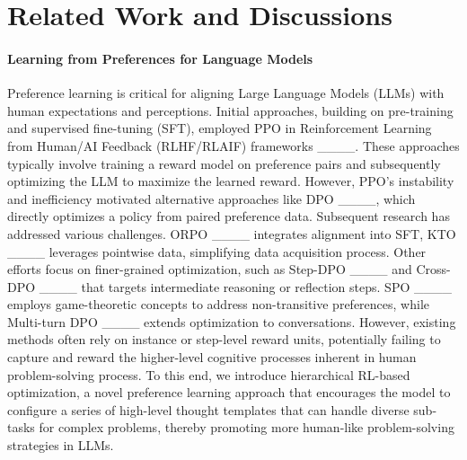 \section{Related Work and Discussions}
\paragraph{Learning from Preferences for Language Models}


Preference learning is critical for aligning Large Language Models (LLMs) with human expectations and perceptions. Initial approaches, building on pre-training and supervised fine-tuning (SFT), employed PPO in Reinforcement Learning from Human/AI Feedback (RLHF/RLAIF) frameworks ____. These approaches typically involve training a reward model on preference pairs and subsequently optimizing the LLM to maximize the learned reward. However, PPO's instability and inefficiency motivated alternative approaches like DPO ____, which directly optimizes a policy from paired preference data.
Subsequent research has addressed various challenges. ORPO ____ integrates alignment into SFT, KTO ____ leverages pointwise data, simplifying data acquisition process. Other efforts focus on finer-grained optimization, such as Step-DPO ____ and Cross-DPO ____ that targets intermediate reasoning or reflection steps. SPO ____ employs game-theoretic concepts to address non-transitive preferences, while Multi-turn DPO ____ extends optimization to conversations. 
However, existing methods often rely on instance or step-level reward units, potentially failing to capture and reward the higher-level cognitive processes inherent in human problem-solving process. 
To this end, we introduce hierarchical RL-based optimization, a novel preference learning approach that encourages the model to configure a series of high-level thought templates that can handle diverse sub-tasks for complex problems, thereby promoting more human-like problem-solving strategies in LLMs.


